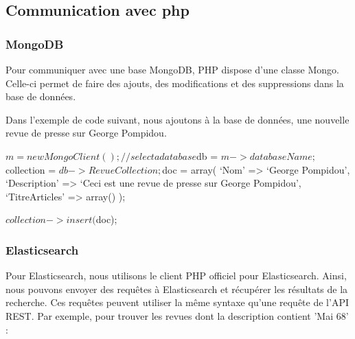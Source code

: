 \subsection{Communication avec php}
\subsubsection{MongoDB}

Pour communiquer avec une base MongoDB, PHP dispose d’une classe Mongo. Celle-ci permet de faire des ajouts, des modifications et des suppressions dans la base de données. 

Dans l'exemple de code suivant, nous ajoutons à la base de données, une nouvelle revue de presse sur George Pompidou.

\begin{verbatimtab}[3]
$m = new MongoClient();

// select a database
$db = $m->databaseName;   
$collection = $db->RevueCollection;

$doc = array(
	‘Nom’ => ‘George Pompidou’,
	‘Description’ => ‘Ceci est une revue de presse sur George Pompidou’,
	‘TitreArticles’ => array()
);

$collection->insert($doc);
\end{verbatimtab}


\subsubsection{Elasticsearch}

Pour Elasticsearch, nous utilisons le client PHP officiel pour Elasticsearch. Ainsi, nous pouvons envoyer des requêtes à Elasticsearch et récupérer les résultats de la recherche. Ces requêtes peuvent utiliser la même syntaxe qu’une requête de l’API REST. Par exemple, pour trouver les revues dont la description contient 'Mai 68' :


